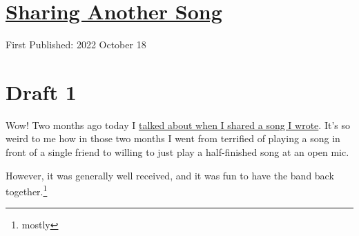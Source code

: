 \documentclass[12pt]{article}[titlepage]
\newcommand{\1}{\={a}}
\newcommand{\2}{\={e}}
\newcommand{\3}{\={\i}}
\newcommand{\4}{\=o}
\newcommand{\5}{\=u}
\newcommand{\6}{\={A}}
\renewcommand{\,}{\textsuperscript{,}}
\begin{document}
\doublespacing
\section{\href{sharing-another-song.html}{Sharing Another Song}}
First Published: 2022 October 18
\section{Draft 1}
Wow! Two months ago today I \href{sharing-a-song}{talked about when I shared a song I wrote}.
It's so weird to me how in those two months I went from terrified of playing a song in front of a single friend to willing to just play a half-finished song at an open mic.

However, it was generally well received, and it was fun to have the band back together.\footnote{mostly}
\end{document}
